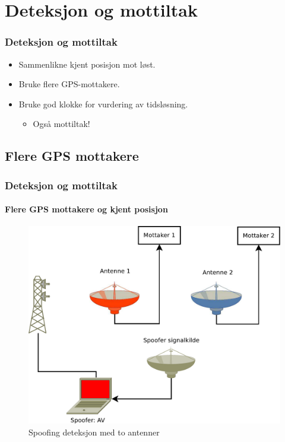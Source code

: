 \documentclass[xcolor=table]{beamer}
\begin{document}

\section{Deteksjon og mottiltak}
\begin{frame}
\frametitle{Deteksjon og mottiltak}
  \begin{itemize}
        \setlength\itemsep{1em}
      \item Sammenlikne kjent posisjon mot løst.
      \item Bruke flere GPS-mottakere.
      \item Bruke god klokke for vurdering av tidsløsning.
        \begin{itemize}
          \item Også mottiltak!
        \end{itemize}
    \end{itemize}
\end{frame}

\subsection{Flere GPS mottakere}
\begin{frame} 
\frametitle{Deteksjon og mottiltak}
  \framesubtitle{Flere GPS mottakere og kjent posisjon}
  \begin{figure}
    \includegraphics[scale=0.23]{thesis/graphics/toantenner.pdf}
    \caption{Spoofing deteksjon med to antenner}
  \end{figure}
\end{frame}
\end{document}

